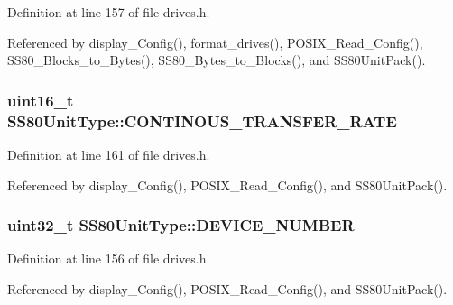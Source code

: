 Definition at line 157 of file drives.\+h.



Referenced by display\+\_\+\+Config(), format\+\_\+drives(), P\+O\+S\+I\+X\+\_\+\+Read\+\_\+\+Config(), S\+S80\+\_\+\+Blocks\+\_\+to\+\_\+\+Bytes(), S\+S80\+\_\+\+Bytes\+\_\+to\+\_\+\+Blocks(), and S\+S80\+Unit\+Pack().

\subsubsection[{\texorpdfstring{C\+O\+N\+T\+I\+N\+O\+U\+S\+\_\+\+T\+R\+A\+N\+S\+F\+E\+R\+\_\+\+R\+A\+TE}{CONTINOUS_TRANSFER_RATE}}]{\setlength{\rightskip}{0pt plus 5cm}uint16\+\_\+t S\+S80\+Unit\+Type\+::\+C\+O\+N\+T\+I\+N\+O\+U\+S\+\_\+\+T\+R\+A\+N\+S\+F\+E\+R\+\_\+\+R\+A\+TE}\hypertarget{structSS80UnitType_a0486673977da185f2f69aaff378f81a2}{}\label{structSS80UnitType_a0486673977da185f2f69aaff378f81a2}


Definition at line 161 of file drives.\+h.



Referenced by display\+\_\+\+Config(), P\+O\+S\+I\+X\+\_\+\+Read\+\_\+\+Config(), and S\+S80\+Unit\+Pack().

\subsubsection[{\texorpdfstring{D\+E\+V\+I\+C\+E\+\_\+\+N\+U\+M\+B\+ER}{DEVICE_NUMBER}}]{\setlength{\rightskip}{0pt plus 5cm}uint32\+\_\+t S\+S80\+Unit\+Type\+::\+D\+E\+V\+I\+C\+E\+\_\+\+N\+U\+M\+B\+ER}\hypertarget{structSS80UnitType_a69cad18aab93449fbd91445c4ba62928}{}\label{structSS80UnitType_a69cad18aab93449fbd91445c4ba62928}


Definition at line 156 of file drives.\+h.



Referenced by display\+\_\+\+Config(), P\+O\+S\+I\+X\+\_\+\+Read\+\_\+\+Config(), and S\+S80\+Unit\+Pack().

